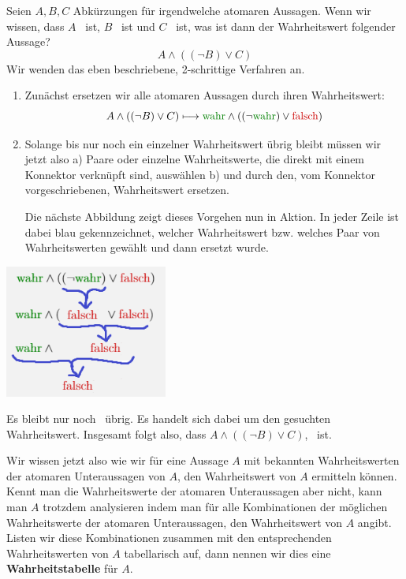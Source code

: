 \documentclass[../../main.tex]{subfiles}
\begin{document}
\begin{example}
Seien $A, B, C$ Abkürzungen für irgendwelche atomaren Aussagen. Wenn wir wissen, dass $A$ \wahr\  ist, $B$ \wahr\  ist und $C$ \falsch\   ist, was ist dann der Wahrheitswert folgender Aussage?
\[A \land ( (\lnot B) \lor C)\]
Wir wenden das eben beschriebene, 2-schrittige Verfahren an.
\begin{enumerate}
    \item Zunächst ersetzen wir alle atomaren Aussagen durch ihren Wahrheitswert:
    \[A \land ( (\lnot B) \lor C) \longmapsto  \wahr \land ((\lnot \wahr) \lor \falsch)\]
    \item Solange bis nur noch ein einzelner Wahrheitswert übrig bleibt müssen wir jetzt also a) Paare oder einzelne Wahrheitswerte, die direkt mit einem Konnektor verknüpft sind, auswählen b) und durch den, vom Konnektor vorgeschriebenen, Wahrheitswert ersetzen.
    
    Die nächste Abbildung zeigt dieses Vorgehen nun in Aktion. In jeder Zeile ist dabei blau gekennzeichnet, welcher Wahrheitswert bzw. welches Paar von Wahrheitswerten gewählt und dann ersetzt wurde. 
\end{enumerate}
\begin{center}
\includegraphics[width=0.4\textwidth]{images/TEMP_wahrheitsalg.png}
\end{center}
Es bleibt nur noch \falsch\  übrig. Es handelt sich dabei um den gesuchten Wahrheitswert. Insgesamt folgt also, dass $A \land ( (\lnot B) \lor C)$, \falsch\  ist.
\end{example}
Wir wissen jetzt also wie wir für eine Aussage $A$ mit bekannten Wahrheitswerten der atomaren Unteraussagen von $A$, den Wahrheitswert von $A$ ermitteln können. Kennt man die Wahrheitswerte der atomaren Unteraussagen aber nicht, kann man $A$ trotzdem analysieren indem man für alle Kombinationen der möglichen Wahrheitswerte der atomaren Unteraussagen, den Wahrheitswert von $A$ angibt. Listen wir diese Kombinationen zusammen mit den entsprechenden Wahrheitswerten von $A$ tabellarisch auf, dann nennen wir dies eine \textbf{Wahrheitstabelle} für $A$. 
\end{document}
